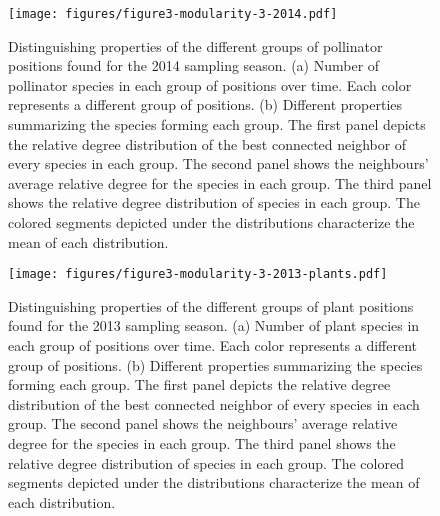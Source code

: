 \documentclass[11pt, a4paper]{article}
\begin{document}
\clearpage

\begin{figure}[p]
  \centering
    \vspace{0.5cm}
    \texttt{[image: figures/figure3-modularity-3-2014.pdf]}
	  \vspace{0.3cm}
	   \caption[Distinguishing properties of the different groups of pollinator positions found for the 2014 sampling season]{Distinguishing properties of the different groups of pollinator positions found for the 2014 sampling season. (a) Number of pollinator species in each group of positions over time. Each color represents a different group of positions. (b) Different properties summarizing the species forming each group. The first panel depicts the relative degree distribution of the best connected neighbor of every species in each group. The second panel shows the neighbours' average relative degree for the species in each group. The third panel shows the relative degree distribution of species in each group. The colored segments depicted under the distributions characterize the mean of each distribution.}
      \label{sfig:groups2014}
\end{figure}

\clearpage

\begin{figure}[p]
  \centering
    \vspace{0.5cm}
    \texttt{[image: figures/figure3-modularity-3-2013-plants.pdf]}
	  \vspace{0.3cm}
	   \caption[Distinguishing properties of the different groups of plant positions found for the 2013 sampling season]{Distinguishing properties of the different groups of plant positions found for the 2013 sampling season. (a) Number of plant species in each group of positions over time. Each color represents a different group of positions. (b) Different properties summarizing the species forming each group. The first panel depicts the relative degree distribution of the best connected neighbor of every species in each group. The second panel shows the neighbours' average relative degree for the species in each group. The third panel shows the relative degree distribution of species in each group. The colored segments depicted under the distributions characterize the mean of each distribution.}
      \label{sfig:groups2013-plants}
\end{figure}

\clearpage
\end{document}
